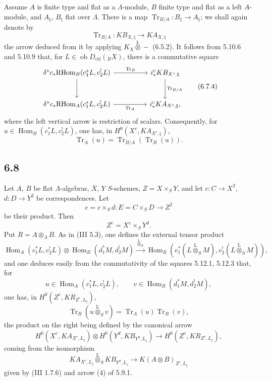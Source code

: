 \documentclass[11pt]{article}
\DeclareMathOperator{\Hom}{Hom}
\providecommand{\RHom}{\mathrm{RHom}}
\providecommand{\Tr}{\operatorname{Tr}}
\providecommand{\Tr}{\operatorname{Tr}}
\providecommand{\lten}{\overset{\mathrm L}{\otimes}}
\providecommand{\Ob}{\operatorname{ob}}
\providecommand{\Tr}{\operatorname{Tr}}
\providecommand{\RHom}{\mathrm{RHom}}
\providecommand{\Hom}{\operatorname{Hom}}
\providecommand{\lten}{\overset{\mathrm L}{\otimes}}
\providecommand{\RHom}{\mathrm R\mathcal{H}om}
\providecommand{\lten}{\overset{\mathrm L}{\otimes}}
\providecommand{\Ob}{\operatorname{ob}}
\providecommand{\Tr}{\operatorname{Tr}}
\providecommand{\lten}{\overset{\mathrm L}{\otimes}}
\providecommand{\lten}{\overset{\mathrm L}{\otimes}}
\providecommand{\Ob}{\operatorname{Ob}}
\providecommand{\lten}{\overset{\mathrm L}{\otimes}}
\providecommand{\RHom}{\mathrm{RHom}}
\begin{document}
Assume $A$ is finite type and flat as a $\Lambda$-module, $B$ finite type and flat as a left $A$-module, and $A_{\natural}$, $B_{\natural}$ flat over $\Lambda$. There is a map $\Tr_{B/A}:B_{\natural}\to A_{\natural}$; we shall again denote by
\begin{equation}
\Tr_{B/A}:KB_{X,\natural}\longrightarrow KA_{X,\natural}
\tag{6.7.3}
\end{equation}
the arrow deduced from it by applying $K_X\lten -$ (6.5.2). It follows from 5.10.6 and 5.10.9 that, for $L\in\Ob D_{\mathrm{ctf}}({}_BX)$, there is a commutative square
\begin{equation}
\begin{tikzcd}[column sep=huge,row sep=large]
\delta^*c_*\RHom_B(c_1^*L,c_2^!L) \arrow[r,"\Tr_B"] \arrow[d]
& i_*^cKB_{X^c,\natural} \arrow[d,"\Tr_{B/A}"]\\
\delta^*c_*\RHom_A(c_1^*L,c_2^!L) \arrow[r,"\Tr_A"']
& i_*^cKA_{X^c,\natural},
\end{tikzcd}
\tag{6.7.4}
\end{equation}
where the left vertical arrow is restriction of scalars. Consequently, for $u\in\Hom_B(c_1^*L,c_2^!L)$, one has, in $H^0(X^c,KA_{X^c,\natural})$,
\begin{equation}
\Tr_A(u)=\Tr_{B/A}(\Tr_B(u)).
\tag{6.7.5}
\end{equation}

\subsection*{6.8}
Let $A$, $B$ be flat $\Lambda$-algebras, $X$, $Y$ $S$-schemes, $Z=X\times_SY$, and let $c:C\to X^2$, $d:D\to Y^2$ be correspondences. Let
\[
e=c\times_Sd:E=C\times_SD\longrightarrow Z^2
\]
be their product. Then
\[
Z^e=X^c\times_SY^d.
\]
Put $R=A\otimes_{\Lambda}B$. As in (III 5.3), one defines the external tensor product
\begin{equation}
\Hom_A(c_1^*L,c_2^!L)\otimes \Hom_B(d_1^*M,d_2^!M)
\xrightarrow{\ \lten_S\ }
\Hom_R(e_1^*(L\lten_SM),e_2^!(L\lten_SM)),
\tag{6.8.1}
\end{equation}
and one deduces easily from the commutativity of the squares 5.12.1, 5.12.3 that, for
\[
u\in\Hom_A(c_1^*L,c_2^!L),\qquad v\in\Hom_B(d_1^*M,d_2^!M),
\]
one has, in $H^0(Z^e,KR_{Z^e,L_{\natural}})$,
\begin{equation}
\Tr_R(u\lten_Sv)=\Tr_A(u)\Tr_B(v),
\tag{6.8.2}
\end{equation}
the product on the right being defined by the canonical arrow
\begin{equation}
H^0(X^c,KA_{X^c,L_{\natural}})\otimes
H^0(Y^d,KB_{Y^d,L_{\natural}})
\longrightarrow
H^0(Z^e,KR_{Z^e,L_{\natural}}),
\tag{6.8.3}
\end{equation}
coming from the isomorphism
\[
KA_{X^c,L_{\natural}}\lten_S KB_{Y^d,L_{\natural}}\longrightarrow K(A\otimes B)_{Z^e,L_{\natural}}
\]
given by (III 1.7.6) and arrow (4) of 5.9.1.
\end{document}
